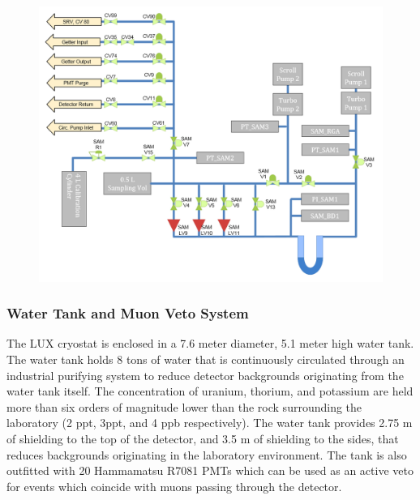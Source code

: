 \begin{figure} [!h]
\includegraphics[scale=.3]{SAMdiagram.png} 
\label{LuxSamSystem}
\end{figure}


\subsubsection{Water Tank and Muon Veto System}

The LUX cryostat is enclosed in a 7.6 meter diameter, 5.1 meter high water tank.  The water tank holds 8 tons of water that is continuously circulated through an industrial purifying system to reduce detector backgrounds originating from the water tank itself.  The concentration of uranium, thorium, and potassium are held more than six orders of magnitude lower than the rock surrounding the laboratory (2 ppt, 3ppt, and 4 ppb respectively). The water tank provides 2.75 m of shielding to the top of the detector, and 3.5 m of shielding to the sides, that reduces backgrounds originating in the laboratory environment.  The tank is also outfitted with 20 Hammamatsu R7081 PMTs which can be used as an active veto for events which coincide with muons passing through the detector.

